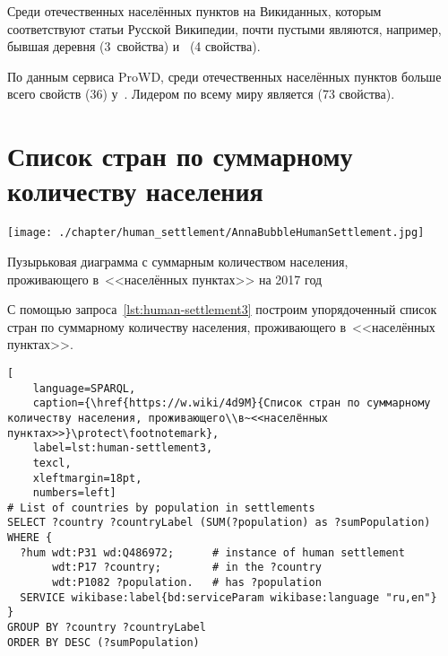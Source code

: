 Среди отечественных населённых пунктов на Викиданных, 
которым соответствуют статьи Русской Википедии, 
почти пустыми являются, например, 
бывшая деревня  (3~свойства) 
и~ (4 свойства).

По данным сервиса ProWD, 
среди отечественных населённых пунктов 
больше всего свойств (36) у~. 
Лидером по всему миру является  (73 свойства).



\newpage
\section{Список стран по суммарному количеству населения}

\begin{marginfigure}[0.0cm]
    \texttt{[image: ./chapter/human\_settlement/AnnaBubbleHumanSettlement.jpg]}
    \caption[Сколько населения проживает в~населённых пунктах, 2017.]{Пузырьковая диаграмма с суммарным количеством населения,\\проживающего в~<<населённых пунктах>> на 2017 год} 
    \label{fig:human-settlement-1}
\end{marginfigure}

С помощью запроса~\ref{lst:human-settlement3} 
построим упорядоченный список стран по суммарному количеству населения, проживающего в~<<населённых пунктах>>.


\lstset{numbers=left, firstnumber=1, frame=single}
\begin{lstlisting}[ 
    language=SPARQL, 
    caption={\href{https://w.wiki/4d9M}{Список стран по суммарному количеству населения, проживающего\\в~<<населённых пунктах>>}\protect\footnotemark},
    label=lst:human-settlement3,
    texcl,
    xleftmargin=18pt, 
    numbers=left]
# List of countries by population in settlements
SELECT ?country ?countryLabel (SUM(?population) as ?sumPopulation)
WHERE {
  ?hum wdt:P31 wd:Q486972;      # instance of human settlement
       wdt:P17 ?country;        # in the ?country
       wdt:P1082 ?population.   # has ?population
  SERVICE wikibase:label{bd:serviceParam wikibase:language "ru,en"}
}
GROUP BY ?country ?countryLabel 
ORDER BY DESC (?sumPopulation)
\end{lstlisting}%


